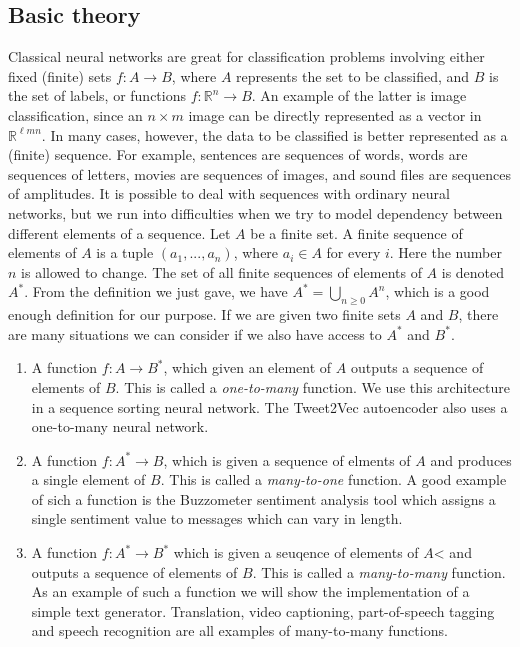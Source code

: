 \documentclass[10pt]{amsart}
\newcommand{\R}{\mathbb{R}}
\theoremstyle{definition}
\begin{document}
\subsection{Basic theory} Classical neural networks are great for classification problems involving either fixed (finite) sets $f:A\to B$, where $A$ represents the set to be classified, and $B$ is the set of labels, or functions $f:\R^n\to B$. An example of the latter is image classification, since an $n\times m$ image can be directly represented as a vector in $\R^{\ell mn}$. In many cases, however, the data to be classified is better represented as a (finite) sequence.  For example, sentences are sequences of words, words are sequences of letters, movies are sequences of images, and sound files are sequences of amplitudes.  It is possible to deal with sequences with ordinary neural networks, but we run into difficulties when we try to model dependency between different elements of a sequence.  Let $A$ be a finite set. A finite sequence of elements of $A$ is a tuple $(a_1,...,a_n)$, where $a_i\in A$ for every $i$.  Here the number $n$ is allowed to change.  The set of all finite sequences of elements of $A$ is denoted $A^*$.  From the definition we just gave, we have $A^*=\bigcup_{n\geq 0} A^n$, which is a good enough definition for our purpose.  If we are given two finite sets $A$ and $B$, there are many situations we can consider if we also have access to $A^*$ and $B^*$.
\begin{enumerate}
  \item A function $f:A\to B^*$, which given an element of $A$ outputs a sequence of elements of $B$.  This is called a {\em one-to-many} function. We use this architecture in a sequence sorting neural network. The Tweet2Vec autoencoder also uses a one-to-many neural network.
  \item A function $f:A^*\to B$, which is given a sequence of elments of $A$ and produces a single element of $B$.  This is called a {\em many-to-one} function.  A good example of sich a function is the Buzzometer sentiment analysis tool which assigns a single sentiment value to messages which can vary in length.
  \item A function $f:A^*\to B^*$ which is given a seuqence of elements of $A$< and outputs a sequence of elements of $B$.  This is called a {\em many-to-many} function.  As an example of such a function we will show the implementation of a simple text generator.  Translation, video captioning, part-of-speech tagging and speech recognition are all examples of many-to-many functions.
\end{enumerate}
\end{document}
